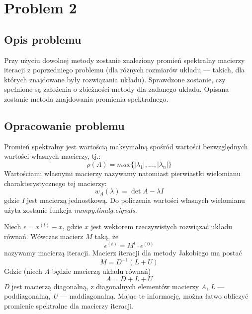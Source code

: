 \documentclass{article}
\begin{document}
\section{Problem 2}
\subsection{Opis problemu}
Przy użyciu dowolnej metody zostanie znaleziony promień spektralny macierzy iteracji z poprzedniego problemu
(dla różnych rozmiarów układu --- takich, dla których znajdowane były rozwiązania układu).
Sprawdzone zostanie, czy spełnione są założenia o zbieżności metody dla zadanego układu. Opisana zostanie metoda znajdowania
promienia spektralnego.

\subsection{Opracowanie problemu}
Promień spektralny jest wartością maksymalną spośród wartości bezwzględnych wartości własnych macierzy, tj.:
$$\rho(A)=max\{|\lambda_1|,..., |\lambda_n|\}$$
Wartościami własnymi macierzy nazywamy natomiast pierwiastki wielomianu charakterystycznego tej macierzy:
$$w_{A}(\lambda)=\det{A- \lambda I}$$
gdzie \textit{I} jest macierzą jednostkową. Do policzenia wartości własnych wielomianu użyta zostanie funkcja 
\textit{numpy.linalg.eigvals}.

Niech $\epsilon=x^{(t)}-x$, gdzie $x$ jest wektorem rzeczywistych rozwiązać układu równań. Wówczas macierz $M$ taką, że
$$\epsilon^{(t)}=M^t \cdot \epsilon^{(0)}$$
nazywamy macierzą iteracji.
Macierz iteracji dla metody Jakobiego ma postać
$$M=D^{-1}(L+U)$$
Gdzie (niech \textit{A} będzie macierzą układu równań)
$$A = D + L + U$$
\textit{D} jest macierzą diagonalną, z diagonalnych elementów macierzy \textit{A}, \textit{L} --- poddiagonalną, 
\textit{U} --- naddiagonalną. Mając te informację, można łatwo obliczyć promienie spektralne dla macierzy iteracji.

\newpage
\thispagestyle{empty}
\end{document}
